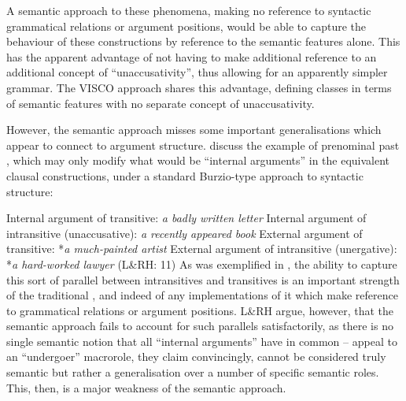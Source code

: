 \documentclass[output=paper]{langsci/langscibook}
\begin{document}
\ea
    \z
\z

\ea
    \z
\z
A semantic approach to these phenomena, making no reference to syntactic
grammatical relations or argument positions, would be able to capture the
behaviour of these constructions by reference to the semantic features alone.
This has the apparent advantage of not having to make additional reference to
an additional concept of \enquote{unaccusativity}, thus allowing for an
apparently simpler grammar. The VISCO approach shares this advantage, defining
classes in terms of semantic features with no separate concept of
unaccusativity.

\hspace*{-0.55959pt}However, the semantic approach misses some important generalisations which
appear to connect  to argument structure.
\textcite[11--12]{LevinRappaportHovav1995} discuss the example of prenominal
past , which may only modify what would be \enquote{internal
arguments} in the equivalent clausal constructions, under a standard
Burzio-type approach to syntactic structure:

\ea
    \ea Internal argument of transitive: \emph{a badly written letter}
    \ex Internal argument of intransitive (unaccusative): \emph{a recently appeared book}
    \ex External argument of transitive: *\emph{a much-painted artist}
    \ex External argument of intransitive (unergative): *\emph{a hard-worked lawyer} (L\&RH: 11)
    \z
\z
As was exemplified in , the ability to capture this sort of parallel
between intransitives and transitives is an important strength of the
traditional , and indeed of any implementations of it
which make reference to grammatical relations or argument positions. L\&RH
argue, however, that the semantic approach fails to account for such parallels
satisfactorily, as there is no single semantic notion that all
\enquote{internal arguments} have in common --  appeal to an
\enquote{undergoer} macrorole, they claim convincingly, cannot be considered
truly semantic but rather a generalisation over a number of specific semantic
roles.  This, then, is a major weakness of the semantic approach.
\end{document}
